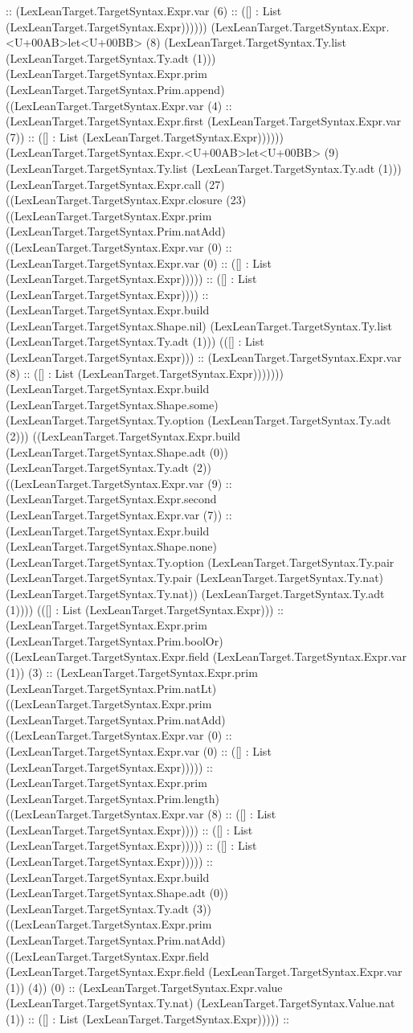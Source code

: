 \documentclass[11pt]{article}
\begin{document}
:: (LexLeanTarget.TargetSyntax.Expr.var (6) :: ([] : List (LexLeanTarget.TargetSyntax.Expr)))))) (LexLeanTarget.TargetSyntax.Expr.<U+00AB>let<U+00BB> (8) (LexLeanTarget.TargetSyntax.Ty.list (LexLeanTarget.TargetSyntax.Ty.adt (1))) (LexLeanTarget.TargetSyntax.Expr.prim (LexLeanTarget.TargetSyntax.Prim.append) ((LexLeanTarget.TargetSyntax.Expr.var (4) :: (LexLeanTarget.TargetSyntax.Expr.first (LexLeanTarget.TargetSyntax.Expr.var (7)) :: ([] : List (LexLeanTarget.TargetSyntax.Expr)))))) (LexLeanTarget.TargetSyntax.Expr.<U+00AB>let<U+00BB> (9) (LexLeanTarget.TargetSyntax.Ty.list (LexLeanTarget.TargetSyntax.Ty.adt (1))) (LexLeanTarget.TargetSyntax.Expr.call (27) ((LexLeanTarget.TargetSyntax.Expr.closure (23) ((LexLeanTarget.TargetSyntax.Expr.prim (LexLeanTarget.TargetSyntax.Prim.natAdd) ((LexLeanTarget.TargetSyntax.Expr.var (0) :: (LexLeanTarget.TargetSyntax.Expr.var (0) :: ([] : List (LexLeanTarget.TargetSyntax.Expr))))) :: ([] : List (LexLeanTarget.TargetSyntax.Expr)))) :: (LexLeanTarget.TargetSyntax.Expr.build (LexLeanTarget.TargetSyntax.Shape.nil) (LexLeanTarget.TargetSyntax.Ty.list (LexLeanTarget.TargetSyntax.Ty.adt (1))) (([] : List (LexLeanTarget.TargetSyntax.Expr))) :: (LexLeanTarget.TargetSyntax.Expr.var (8) :: ([] : List (LexLeanTarget.TargetSyntax.Expr))))))) (LexLeanTarget.TargetSyntax.Expr.build (LexLeanTarget.TargetSyntax.Shape.some) (LexLeanTarget.TargetSyntax.Ty.option (LexLeanTarget.TargetSyntax.Ty.adt (2))) ((LexLeanTarget.TargetSyntax.Expr.build (LexLeanTarget.TargetSyntax.Shape.adt (0)) (LexLeanTarget.TargetSyntax.Ty.adt (2)) ((LexLeanTarget.TargetSyntax.Expr.var (9) :: (LexLeanTarget.TargetSyntax.Expr.second (LexLeanTarget.TargetSyntax.Expr.var (7)) :: (LexLeanTarget.TargetSyntax.Expr.build (LexLeanTarget.TargetSyntax.Shape.none) (LexLeanTarget.TargetSyntax.Ty.option (LexLeanTarget.TargetSyntax.Ty.pair (LexLeanTarget.TargetSyntax.Ty.pair (LexLeanTarget.TargetSyntax.Ty.nat) (LexLeanTarget.TargetSyntax.Ty.nat)) (LexLeanTarget.TargetSyntax.Ty.adt (1)))) (([] : List (LexLeanTarget.TargetSyntax.Expr))) :: (LexLeanTarget.TargetSyntax.Expr.prim (LexLeanTarget.TargetSyntax.Prim.boolOr) ((LexLeanTarget.TargetSyntax.Expr.field (LexLeanTarget.TargetSyntax.Expr.var (1)) (3) :: (LexLeanTarget.TargetSyntax.Expr.prim (LexLeanTarget.TargetSyntax.Prim.natLt) ((LexLeanTarget.TargetSyntax.Expr.prim (LexLeanTarget.TargetSyntax.Prim.natAdd) ((LexLeanTarget.TargetSyntax.Expr.var (0) :: (LexLeanTarget.TargetSyntax.Expr.var (0) :: ([] : List (LexLeanTarget.TargetSyntax.Expr))))) :: (LexLeanTarget.TargetSyntax.Expr.prim (LexLeanTarget.TargetSyntax.Prim.length) ((LexLeanTarget.TargetSyntax.Expr.var (8) :: ([] : List (LexLeanTarget.TargetSyntax.Expr)))) :: ([] : List (LexLeanTarget.TargetSyntax.Expr))))) :: ([] : List (LexLeanTarget.TargetSyntax.Expr))))) :: (LexLeanTarget.TargetSyntax.Expr.build (LexLeanTarget.TargetSyntax.Shape.adt (0)) (LexLeanTarget.TargetSyntax.Ty.adt (3)) ((LexLeanTarget.TargetSyntax.Expr.prim (LexLeanTarget.TargetSyntax.Prim.natAdd) ((LexLeanTarget.TargetSyntax.Expr.field (LexLeanTarget.TargetSyntax.Expr.field (LexLeanTarget.TargetSyntax.Expr.var (1)) (4)) (0) :: (LexLeanTarget.TargetSyntax.Expr.value (LexLeanTarget.TargetSyntax.Ty.nat) (LexLeanTarget.TargetSyntax.Value.nat (1)) :: ([] : List (LexLeanTarget.TargetSyntax.Expr))))) :: 
\end{document}
